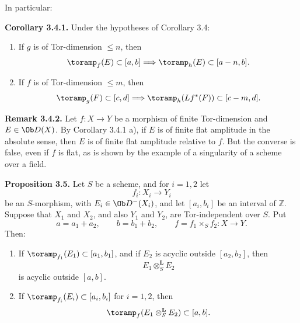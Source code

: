 In particular:

\textbf{Corollary 3.4.1.} Under the hypotheses of Corollary 3.4:
\begin{enumerate}[label=\alph*)]
\item If \(g\) is of Tor-dimension \(\leq n\), then
\[
  \toramp_f(E)\subset[a,b]\Longrightarrow
  \toramp_h(E)\subset[a-n,b].
\]
\item If \(f\) is of Tor-dimension \(\leq m\), then
\[
  \toramp_g(F)\subset[c,d]\Longrightarrow
  \toramp_h(Lf^*(F))\subset[c-m,d].
\]
\end{enumerate}

\textbf{Remark 3.4.2.} Let \(f:X\to Y\) be a morphism of finite Tor-dimension and \(E\in \Ob D(X)\). By Corollary 3.4.1 a), if \(E\) is of finite flat amplitude in the absolute sense, then \(E\) is of finite flat amplitude relative to \(f\). But the converse is false, even if \(f\) is flat, as is shown by the example of a singularity of a scheme over a field.

\textbf{Proposition 3.5.} Let \(S\) be a scheme, and for \(i=1,2\) let
\[
  f_i:X_i\longrightarrow Y_i
\]
be an \(S\)-morphism, with \(E_i\in \Ob D^{-}(X_i)\), and let \([a_i,b_i]\) be an interval of \(\mathbb Z\). Suppose that \(X_1\) and \(X_2\), and also \(Y_1\) and \(Y_2\), are Tor-independent over \(S\). Put
\[
  a=a_1+a_2,\qquad b=b_1+b_2,\qquad
  f=f_1\times_S f_2:X\to Y.
\]
Then:
\begin{enumerate}[label=\alph*)]
\item If \(\toramp_{f_1}(E_1)\subset[a_1,b_1]\), and if \(E_2\) is acyclic outside \([a_2,b_2]\), then
\[
  E_1\otimes_S^{\mathbf L}E_2
\]
is acyclic outside \([a,b]\).

\item If \(\toramp_{f_i}(E_i)\subset[a_i,b_i]\) for \(i=1,2\), then
\[
  \toramp_f(E_1\otimes_S^{\mathbf L}E_2)\subset[a,b].
\]
\end{enumerate}

